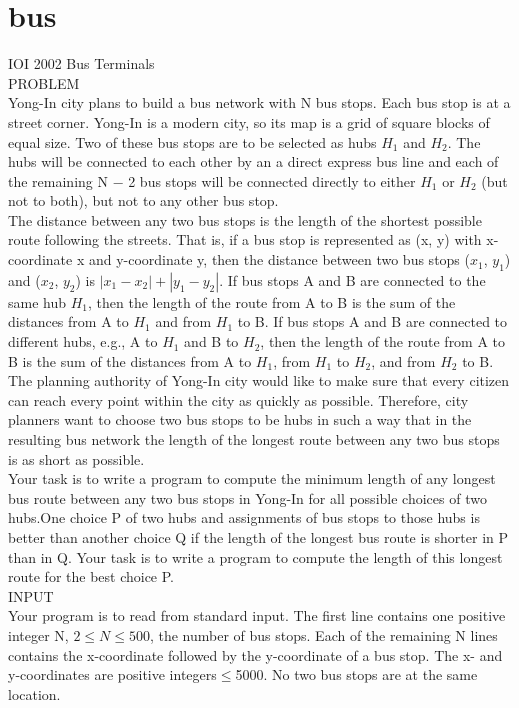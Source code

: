 \documentclass[12pt,twiside,a4paper]{ctexbook}
\numberwithin{chapter}{part}
\begin{document}
\section{bus}
IOI 2002 Bus Terminals\\
PROBLEM\\
Yong-In city plans to build a bus network with N bus stops. Each bus stop is at a street corner. Yong-In is a modern city, so its map is a grid of square blocks of equal size. Two of these bus stops are to be selected as hubs $H_1$ and $H_2$. The hubs will be connected to each other by an a direct express bus line and each of the remaining N − 2 bus stops will be connected directly to either $H_1$ or $H_2$  (but not to both), but not to any other bus stop.\\
The distance between any two bus stops is the length of the shortest possible route following the streets. That is, if a bus stop is represented as (x, y) with x-coordinate x and y-coordinate y, then the distance between two bus stops ($x_1$, $y_1$) and ($x_2$, $y_2$) is $|x_1-x_2|+|y_1-y_2|$. If bus stops A and B are connected to the same hub $H_1$, then the length of the route from A to B is the sum of the distances from A to $H_1$ and from $H_1$ to B. If bus stops A and B are connected to different hubs, e.g., A to $H_1$ and B to $H_2$, then the length of the route from A to B is the sum of the distances from A to $H_1$, from $H_1$ to $H_2$, and from $H_2$ to B.\\
The planning authority of Yong-In city would like to make sure that every citizen can reach every point within the city as quickly as possible. Therefore, city planners want to choose two bus stops to be hubs in such a way that in the resulting bus network the length of the longest route between any two bus stops is as short as possible. \\
Your task is to write a program to compute the minimum length of any longest bus route between any two bus stops in Yong-In for all possible choices of two hubs.One choice P of two hubs and assignments of bus stops to those hubs is better than another choice Q if the length of the longest bus route is shorter in P than in Q.  Your task is to write a program to compute the length of this longest route for the best choice P. \\
INPUT\\
Your program is to read from standard input. The first line contains one positive integer N, $2\leq N\leq 500$, the number of bus stops. Each of the remaining N lines contains the x-coordinate followed by the y-coordinate of a bus stop. The x- and y-coordinates are positive integers$\leq$5000.  No two bus stops are at the same location.\\
\end{document}
